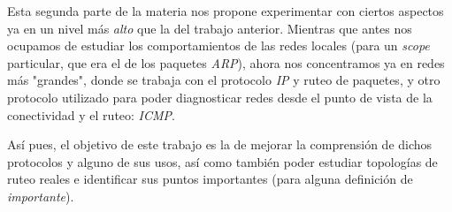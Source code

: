 Esta segunda parte de la materia nos propone experimentar con ciertos
aspectos ya en un nivel m\'as \textit{alto} que la del trabajo anterior. Mientras
que antes nos ocupamos de estudiar los comportamientos de las redes locales
(para un \textit{scope} particular, que era el de los paquetes \textit{ARP}),
ahora nos concentramos ya en redes m\'as "grandes", donde se trabaja
con el protocolo \textit{IP} y ruteo de paquetes, y otro protocolo utilizado
para poder diagnosticar redes desde el punto de vista de la conectividad y el
ruteo: \textit{ICMP}.

\par As\'i pues, el objetivo de este trabajo es la de mejorar la comprensi\'on
de dichos protocolos y alguno de sus usos, as\'i como tambi\'en poder
estudiar topolog\'ias de ruteo\cite{routing} reales e identificar sus puntos
importantes (para alguna definici\'on de \textit{importante}).
